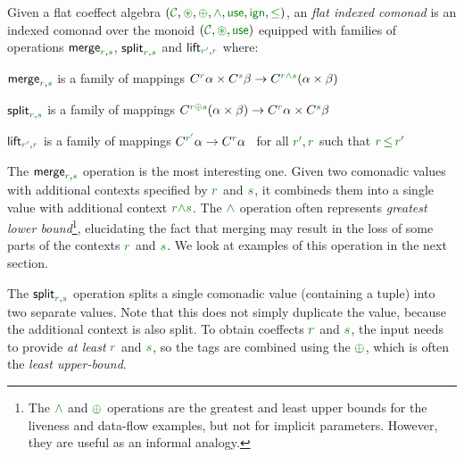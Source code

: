 \begin{definition}
Given a flat coeffect algebra $(\C, \cseq, \cpar, \czip, \cunit, \czero, \cleq)$,
an \emph{flat indexed comonad} is an indexed comonad over the monoid $(\C, \cseq, \cunit)$
equipped with families of operations $\ident{merge}_{\cclrd{r},\cclrd{s}}$, $\ident{split}_{\cclrd{r},\cclrd{s}}$ 
and $\ident{lift}_{\cclrd{r'},\cclrd{r}}$ where:
%
\begin{compactitem}
\item $\ident{merge}_{\cclrd{r},\cclrd{s}}$ is a family of mappings
  $\ctyp{\cclrd{r}}{\alpha} \times \ctyp{\cclrd{s}}{\beta} \rightarrow \ctyp{\cclrd{r}\czip\cclrd{s}}{(\alpha \times \beta)}$
\item $\ident{split}_{\cclrd{r},\cclrd{s}}$ is a family of mappings
  $\ctyp{\cclrd{r}\cpar\cclrd{s}}{(\alpha \times \beta)} \rightarrow \ctyp{\cclrd{r}}{\alpha} \times \ctyp{\cclrd{s}}{\beta}$
\item $\ident{lift}_{\cclrd{r'},\cclrd{r}}$ is a family of mappings
  $\ctyp{\cclrd{r'}}{\alpha} \rightarrow \ctyp{\cclrd{r}}{\alpha}$~ for all $\cclrd{r'}, \cclrd{r}$ such that $\cclrd{r}\,\cleq\,\cclrd{r'}$
\end{compactitem}
%
%
%
%
\end{definition}

\noindent
The $\ident{merge}_{\cclrd{r},\cclrd{s}}$ operation is the most interesting one. Given two comonadic
values with additional contexts specified by $\cclrd{r}$ and $\cclrd{s}$, it combineds them into a 
single value with additional context $\cclrd{r}\czip\cclrd{s}$. The $\czip$ operation often represents
\emph{greatest lower bound}\footnote{The $\czip$ and $\cpar$ operations are the greatest and least upper 
bounds for the liveness and data-flow examples, but not for implicit parameters. However, they are useful 
as an informal analogy.}, elucidating the fact that merging may result in the loss of some parts of 
the contexts $\cclrd{r}$ and $\cclrd{s}$. We look at examples of this operation in the next section.

The $\ident{split}_{\cclrd{r},\cclrd{s}}$ operation splits a single comonadic value (containing a tuple)
into two separate values. Note that this does not simply duplicate the value, because the additional
context is also split. To obtain coeffects $\cclrd{r}$ and $\cclrd{s}$, the input needs to provide 
\emph{at least} $\cclrd{r}$ and $\cclrd{s}$, so the tags are combined using the $\cpar$, which is often 
the \emph{least upper-bound}\footnotemark[1].

